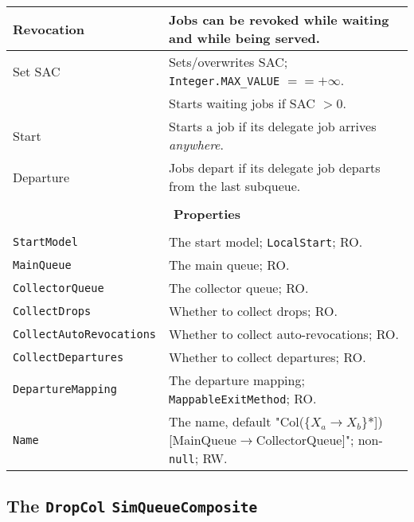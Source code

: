 \begin{tabular}{|l|l|}
	\hline
	Revocation & Jobs can be revoked while waiting and while being served. \\
	\hline
	Set SAC & Sets/overwrites SAC; \lstinline|Integer.MAX_VALUE| $== +\infty$. \\
	& Starts waiting jobs if SAC $> 0$. \\
	\hline
	Start & Starts a job if its delegate job arrives {\em anywhere}. \\
	\hline
	Departure & Jobs depart if its delegate job departs from the last subqueue. \\
	\hline
	\multicolumn{2}{|c|}{} \\
	\multicolumn{2}{|c|}{\bf Properties} \\
	\multicolumn{2}{|c|}{} \\
	\hline
	\lstinline|StartModel|    & The start model; \lstinline|LocalStart|; RO. \\
	\hline
	\lstinline|MainQueue| & The main queue; RO. \\
	\hline
	\lstinline|CollectorQueue| & The collector queue; RO. \\
	\hline
	\lstinline|CollectDrops| & Whether to collect drops; RO. \\
	\hline
	\lstinline|CollectAutoRevocations| & Whether to collect auto-revocations; RO. \\
	\hline
	\lstinline|CollectDepartures| & Whether to collect departures; RO. \\
	\hline
	\lstinline|DepartureMapping| & The departure mapping; \lstinline|MappableExitMethod|; RO. \\
	\hline
	\lstinline|Name|          & The name, default "Col(\{$X_{a}\rightarrow X_{b}$\}*])[MainQueue$\rightarrow$CollectorQueue]"; non-\lstinline|null|; RW. \\
	\hline
\end{tabular}

\subsection{The \lstinline{DropCol} \lstinline{SimQueueComposite}}
\label{sec:DropCol}

